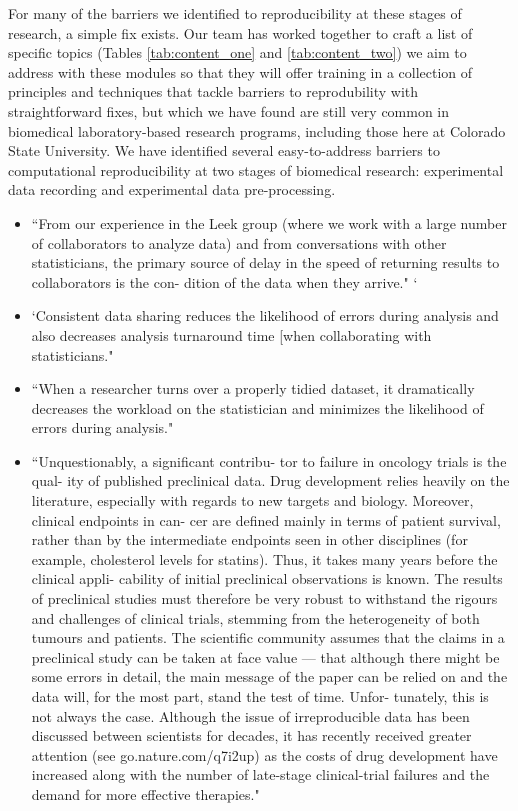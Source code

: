 \documentclass[pdftex,english,11pt,parskip=half]{scrartcl}
\begin{document}
For many of the barriers we identified to reproducibility at these stages of
research, a simple fix exists. Our team has worked together to craft a list of
specific topics (Tables \ref{tab:content_one} and \ref{tab:content_two}) we aim
to address with these modules so that they will offer training in a collection
of principles and techniques that tackle barriers to reprodubility with
straightforward fixes, but which we have found are still very common in
biomedical laboratory-based research programs, including those here at Colorado
State University. We have identified several easy-to-address barriers to
computational reproducibility at two stages of biomedical research: experimental
data recording and experimental data pre-processing.

\begin{itemize}
\item ``From our experience in the Leek group (where we work with a large number of collaborators to analyze data) and from conversations with other statisticians, the primary source of delay in the speed of returning results to collaborators is the con- dition of the data when they arrive." \cite{ellis2018share} `
\item `Consistent data sharing reduces the likelihood of errors during analysis and also decreases analysis turnaround time [when collaborating with statisticians."  \cite{ellis2018share} 
\item ``When a researcher turns over a properly tidied dataset, it dramatically decreases the workload on the statistician and minimizes the likelihood of errors during analysis."  \cite{ellis2018share}
\item ``Unquestionably, a significant contribu- tor to failure in oncology trials is the qual- ity of published preclinical data. Drug development relies heavily on the literature, especially with regards to new targets and biology. Moreover, clinical endpoints in can- cer are defined mainly in terms of patient survival, rather than by the intermediate endpoints seen in other disciplines (for example, cholesterol levels for statins). Thus, it takes many years before the clinical appli- cability of initial preclinical observations is known. The results of preclinical studies must therefore be very robust to withstand the rigours and challenges of clinical trials, stemming from the heterogeneity of both tumours and patients. The scientific community assumes that the claims in a preclinical study can be taken at face value — that although there might be some errors in detail, the main message of the paper can be relied on and the data will, for the most part, stand the test of time. Unfor- tunately, this is not always the case. Although the issue of irreproducible data has been discussed between scientists for decades, it has recently received greater attention (see go.nature.com/q7i2up) as the costs of drug development have increased along with the number of late-stage clinical-trial failures and the demand for more effective therapies." \cite{begley2012drug}

\end{itemize}
\end{document}
